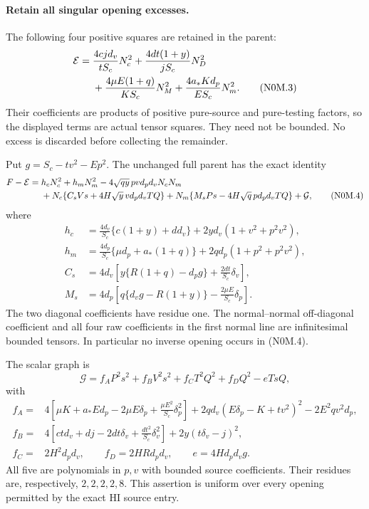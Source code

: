 \paragraph{Retain all singular opening excesses.}
The following four positive squares are retained in the parent:
\begin{align}
 \mathcal E={}&\frac{4cj d_v}{tS_c}N_c^2
 +\frac{4dt(1+y)}{jS_c}N_D^2\notag\\
 &+\frac{4\mu E(1+q)}{KS_c}N_M^2
 +\frac{4a_*K d_p}{ES_c}N_m^2.                 \tag{N0M.3}
\end{align}
Their coefficients are products of positive pure-source and pure-testing
factors, so the displayed terms are actual tensor squares. They need
not be bounded. No excess is discarded before collecting the remainder.

Put $g=S_c-tv^2-Ep^2$. The unchanged full parent has the exact identity
\begin{align}
 F-\mathcal E={}&h_cN_c^2+h_mN_m^2
 -4\sqrt{qy}\,pv d_pd_vN_cN_m\notag\\
 &+N_c\{C_sVs+4H\sqrt y\,v d_pd_vTQ\}
 +N_m\{M_sPs-4H\sqrt q\,p d_pd_vTQ\}
 +\mathcal G,                                           \tag{N0M.4}
\end{align}
where
\begin{align*}
 h_c&=\frac{4d_v}{S_c}\{c(1+y)+dd_v\}
       +2yd_v(1+v^2+p^2v^2),\\
 h_m&=\frac{4d_p}{S_c}\{\mu d_p+a_*(1+q)\}
       +2qd_p(1+p^2+p^2v^2),\\
 C_s&=4d_v\left[y\{R(1+q)-d_pg\}
                    +\frac{2dt}{S_c}\delta_v\right],\\
 M_s&=4d_p\left[q\{d_vg-R(1+y)\}
                    -\frac{2\mu E}{S_c}\delta_p\right].
\end{align*}
The two diagonal coefficients have residue one. The normal--normal
off-diagonal coefficient and all four raw coefficients in the first
normal line are infinitesimal bounded tensors. In particular no inverse
opening occurs in (N0M.4).

The scalar graph is
\[
 \mathcal G=f_AP^2s^2+f_BV^2s^2
       +f_CT^2Q^2+f_DQ^2-eTsQ,                         \tag{N0M.5}
\]
with
\begin{align*}
 f_A={}&4\left[\mu K+a_*Ed_p-2\mu E\delta_p
                    +\frac{\mu E^2}{S_c}\delta_p^2\right]
 +2qd_v(E\delta_p-K+tv^2)^2-2E^2qv^2d_p,\\
 f_B={}&4\left[ctd_v+dj-2dt\delta_v
                    +\frac{dt^2}{S_c}\delta_v^2\right]
 +2y(t\delta_v-j)^2,\\
 f_C={}&2H^2d_pd_v,\qquad f_D=2HRd_pd_v,
 \qquad e=4Hd_pd_vg.
\end{align*}
All five are polynomials in $p,v$ with bounded source coefficients.
Their residues are, respectively, $2,2,2,2,8$. This assertion is uniform
over every opening permitted by the exact HI source entry.

